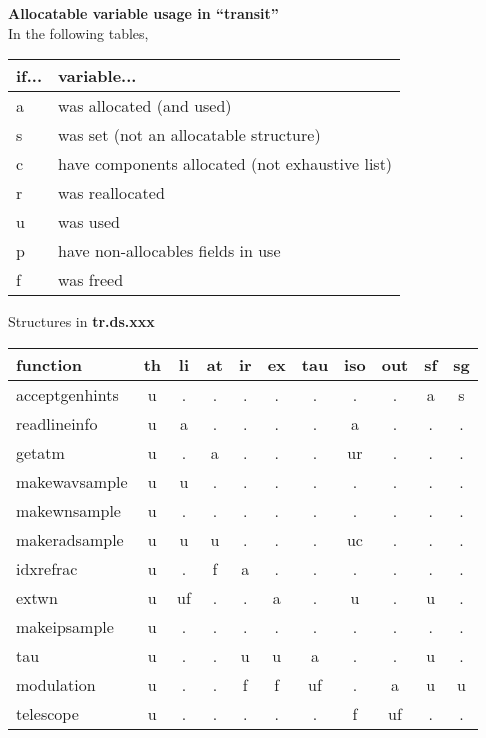 \documentclass{article}
\begin{document}
\begin{center}
{\large {\bf Allocatable variable usage in ``transit''}}\\
\vfill
In the following tables, \\
\begin{tabular}{ll}
if... & variable...\\
\hline
a & was allocated (and used) \\
s & was set (not an allocatable structure)\\
c & have components allocated (not exhaustive list) \\
r & was reallocated \\
u & was used \\
p & have non-allocables fields in use \\
f & was freed \\
\end{tabular}
\end{center}

\vfill

\begin{center}
{\large Structures in {\bf tr.ds.xxx}}\\[.5cm]
\begin{tabular}{l|cccccccccc}
function
  & th & li & at & ir & ex & tau & iso & out & sf & sg \\
\hline
acceptgenhints
  & u  & .  & .  & .  & .  & .   & .   & .   & a  & s  \\
readlineinfo
  & u  & a  & .  & .  & .  & .   & a   & .   & .  & .  \\
getatm
  & u  & .  & a  & .  & .  & .   & ur  & .   & .  & .  \\
makewavsample
  & u  & u  & .  & .  & .  & .   & .   & .   & .  & .  \\
makewnsample
  & u  & .  & .  & .  & .  & .   & .   & .   & .  & .  \\
makeradsample
  & u  & u  & u  & .  & .  & .   & uc  & .   & .  & .  \\
idxrefrac
  & u  & .  & f  & a  & .  & .   & .   & .   & .  & .  \\
extwn
  & u  & uf & .  & .  & a  & .   & u   & .   & u  & .  \\
makeipsample
  & u  & .  & .  & .  & .  & .   & .   & .   & .  & .  \\
tau
  & u  & .  & .  & u  & u  & a   & .   & .   & u  & .  \\
modulation
  & u  & .  & .  & f  & f  & uf  & .   & a   & u  & u  \\
telescope
  & u  & .  & .  & .  & .  & .   & f   & uf  & .  & .  \\
\hline
\end{tabular}
\end{center}
\end{document}

